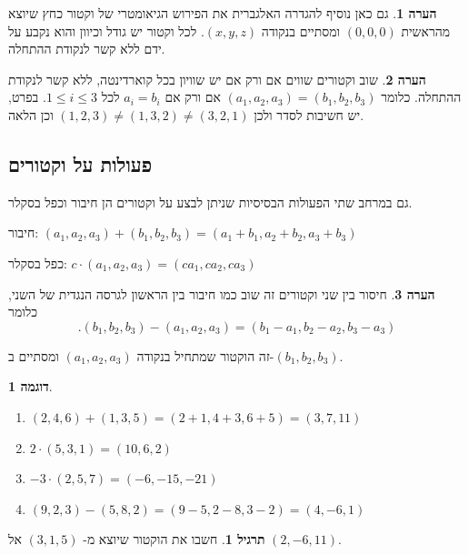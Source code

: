 \documentclass[12pt]{report}
\theoremstyle{plain}
\theoremstyle{definition}
\newtheorem{example}{דוגמה}[chapter]
\newtheorem{exercise}{תרגיל}[chapter]
\newtheorem{remark}{הערה}[chapter]
\newcommand{\0}{\mathbf{0}}
\begin{document}
\begin{remark}
גם כאן נוסיף להגדרה האלגברית את הפירוש הגיאומטרי של וקטור כחץ שיוצא מהראשית
$(0,0,0)$
ומסתיים בנקודה
$.(x,y,z)$
לכל וקטור יש גודל וכיוון והוא נקבע על ידם ללא קשר לנקודת ההתחלה.
\end{remark}

\begin{remark}
שוב וקטורים שווים אם ורק אם יש שוויון בכל קוארדינטה, ללא קשר
לנקודת ההתחלה. כלומר $(a_1,a_2,a_3)=(b_1,b_2,b_3)$
אם ורק אם
$a_{i}=b_{i}$
לכל
$.1\leq i\leq3$
בפרט, יש חשיבות לסדר ולכן
$(1,2,3)\neq(1,3,2)\neq (3,2,1)$
וכן הלאה.
\end{remark}

\subsection{פעולות על וקטורים}

גם במרחב שתי הפעולות הבסיסיות שניתן לבצע על וקטורים הן חיבור וכפל
בסקלר.

חיבור: $(a_1,a_2,a_3)+(b_1,b_2,b_3)=(a_1+b_1,a_2+b_2,a_3+b_3)$

כפל בסקלר: $c\cdot(a_1,a_2,a_3)=(ca_1,ca_2,ca_3)$ 

\begin{remark}
חיסור בין שני וקטורים זה שוב כמו חיבור בין הראשון לגרסה הנגדית
של השני, כלומר
\begin{equation}\label{eqn:points-vector-3d}	
	.(b_1,b_2,b_3)-(a_1,a_2,a_3)=(b_1-a_1,b_2-a_2,b_3-a_3)	
\end{equation}

זה הוקטור שמתחיל בנקודה $(a_1,a_2,a_3)$ ומסתיים ב-$(b_1,b_2,b_3)$.
\end{remark}

\begin{example}\
\begin{enumerate}[label=\alph*.]
\item $(2,4,6)+(1,3,5)=(2+1,4+3,6+5)=(3,7,11)$

\item $2\cdot(5,3,1)=(10,6,2)$

\item $-3\cdot(2,5,7)=(-6,-15,-21)$

\item $(9,2,3)-(5,8,2)=(9-5,2-8,3-2)=(4,-6,1)$
\end{enumerate}
\end{example}

\begin{exercise}
חשבו את הוקטור שיוצא מ-
$(3,1,5)$
אל
$(2,-6,11)$. 
\end{exercise}
\end{document}
